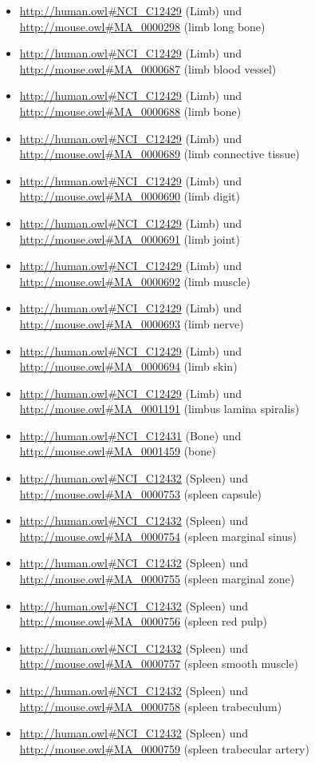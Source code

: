 \begin{itemize}
	\item \url{http://human.owl#NCI_C12429} (Limb) und \url{http://mouse.owl#MA_0000298} (limb long bone)
	\item \url{http://human.owl#NCI_C12429} (Limb) und \url{http://mouse.owl#MA_0000687} (limb blood vessel)
	\item \url{http://human.owl#NCI_C12429} (Limb) und \url{http://mouse.owl#MA_0000688} (limb bone)
	\item \url{http://human.owl#NCI_C12429} (Limb) und \url{http://mouse.owl#MA_0000689} (limb connective tissue)
	\item \url{http://human.owl#NCI_C12429} (Limb) und \url{http://mouse.owl#MA_0000690} (limb digit)
	\item \url{http://human.owl#NCI_C12429} (Limb) und \url{http://mouse.owl#MA_0000691} (limb joint)
	\item \url{http://human.owl#NCI_C12429} (Limb) und \url{http://mouse.owl#MA_0000692} (limb muscle)
	\item \url{http://human.owl#NCI_C12429} (Limb) und \url{http://mouse.owl#MA_0000693} (limb nerve)
	\item \url{http://human.owl#NCI_C12429} (Limb) und \url{http://mouse.owl#MA_0000694} (limb skin)
	\item \url{http://human.owl#NCI_C12429} (Limb) und \url{http://mouse.owl#MA_0001191} (limbus lamina spiralis)
	\item \url{http://human.owl#NCI_C12431} (Bone\textunderscoreMarrow) und \url{http://mouse.owl#MA_0001459} (bone)
	\item \url{http://human.owl#NCI_C12432} (Spleen) und \url{http://mouse.owl#MA_0000753} (spleen capsule)
	\item \url{http://human.owl#NCI_C12432} (Spleen) und \url{http://mouse.owl#MA_0000754} (spleen marginal sinus)
	\item \url{http://human.owl#NCI_C12432} (Spleen) und \url{http://mouse.owl#MA_0000755} (spleen marginal zone)
	\item \url{http://human.owl#NCI_C12432} (Spleen) und \url{http://mouse.owl#MA_0000756} (spleen red pulp)
	\item \url{http://human.owl#NCI_C12432} (Spleen) und \url{http://mouse.owl#MA_0000757} (spleen smooth muscle)
	\item \url{http://human.owl#NCI_C12432} (Spleen) und \url{http://mouse.owl#MA_0000758} (spleen trabeculum)
	\item \url{http://human.owl#NCI_C12432} (Spleen) und \url{http://mouse.owl#MA_0000759} (spleen trabecular artery)

\end{itemize}
